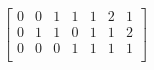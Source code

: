 \documentclass{article}
\begin{document}
 $
\left[
\begin{array}{c|c|c|c|c|c|c}
0 & 0 & 1 & 1 & 1 & 2 & 1 \\
0 & 1 & 1 & 0 & 1 & 1 & 2 \\
0 & 0 & 0 & 1 & 1 & 1 & 1 \\
\end{array}
\right] $
\end{document}
